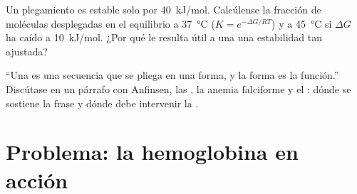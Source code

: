 \begin{exercise}[$\star\star\star$]\label{exo:b1:proteins:11}
Un plegamiento es estable solo por \qty{40}{kJ/mol}. Calcúlense la fracción
de moléculas desplegadas en el equilibrio a \qty{37}{\celsius}
($K = e^{-\Delta G/RT}$) y a \qty{45}{\celsius} si $\Delta G$ ha caído a
\qty{10}{kJ/mol}. ¿Por qué le resulta útil a una  una estabilidad tan
ajustada?
\end{exercise}

\begin{exercise}[$\star\star\star$]\label{exo:b1:proteins:12}
``Una  es una secuencia que se pliega en una forma, y la forma es la
función.'' Discútase en un párrafo con Anfinsen, las , la anemia
falciforme y el : dónde se sostiene la frase y dónde debe
intervenir la .
\end{exercise}

\section{Problema: la hemoglobina en acción}

